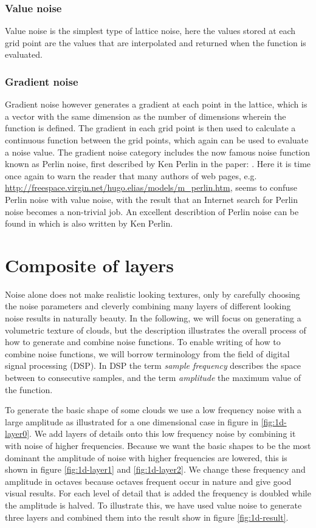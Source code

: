 \subsubsection{Value noise}
Value noise is the simplest type of lattice noise, here the values
stored at each grid point are the values that are interpolated and
returned when the function is evaluated.

\subsubsection{Gradient noise}
Gradient noise however generates a gradient at each point in the
lattice, which is a vector with the same dimension as the number of
dimensions wherein the function is defined. The gradient in each grid
point is then used to calculate a continuous function between the grid
points, which again can be used to evaluate a noise value.
%
The gradient noise category includes the now famous noise
function known as Perlin noise, first described by Ken Perlin in
the paper: .
%
Here it is time once again to warn the reader that many authors of web
pages,
e.g. \url{http://freespace.virgin.net/hugo.elias/models/m_perlin.htm},
seems to confuse Perlin noise with value noise, with the result that
an Internet search for Perlin noise becomes a non-trivial job. An
excellent describtion of Perlin noise can be found in
 which is also written by Ken Perlin.

\section{Composite of layers}
Noise alone does not make realistic looking textures, only by carefully
choosing the noise parameters and cleverly combining many layers of
different looking noise results in naturally beauty. In the following,
we will focus on generating a volumetric texture of clouds, but the
description illustrates the overall process of how to generate and
combine noise functions.
%
To enable writing of how to combine noise functions, we will borrow
terminology from the field of digital signal processing (DSP).
In DSP the term \emph{sample frequency}
describes the space between to consecutive samples, and the term
\emph{amplitude} the maximum value of the function.

To generate the basic shape of some clouds we use a low
frequency noise with a large amplitude as illustrated for a one
dimensional case in figure in \ref{fig:1d-layer0}.
%
We add layers of details onto this low frequency noise by combining it 
with noise of higher frequencies.
Because we want the basic shapes to be the most
dominant the amplitude of noise with higher frequencies are lowered,
this is shown in figure \ref{fig:1d-layer1} and \ref{fig:1d-layer2}.
%
We change these frequency and amplitude in octaves because
octaves frequent occur in nature and give good visual results.
For each level of detail that is added the frequency is doubled while
the amplitude is halved. To illustrate this, we have used value noise
to generate three layers and combined them into the result show in
figure \ref{fig:1d-result}.

